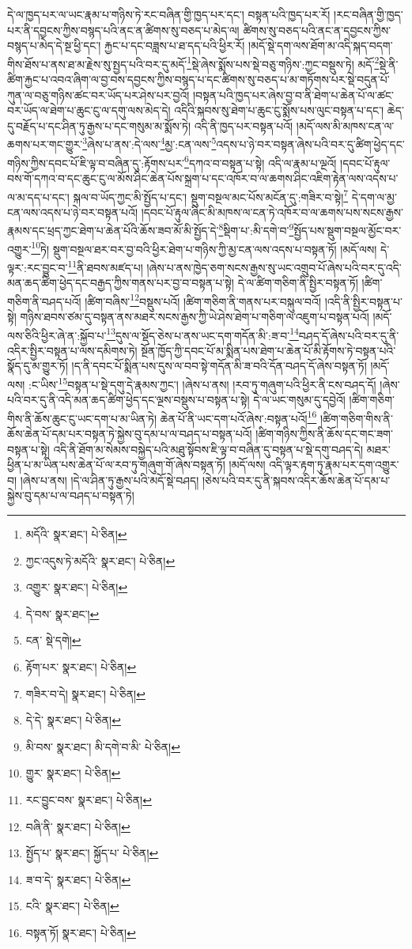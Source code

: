 དེ་ལ་ཁྱད་པར་ལ་ཡང་རྣམ་པ་གཉིས་ཏེ་རང་བཞིན་གྱི་ཁྱད་པར་དང་། བསྟན་པའི་ཁྱད་པར་རོ། །རང་བཞིན་གྱི་ཁྱད་པར་ནི་དབྱངས་ཀྱིས་བསྙད་པའི་ནང་ན་ཚིགས་སུ་བཅད་པ་མེད་ལ། ཚིགས་སུ་བཅད་པའི་ནང་ན་དབྱངས་ཀྱིས་བསྙད་པ་མེད་དེ་སྔ་ཕྱི་དང་། རྐྱང་པ་དང་བཟླས་པ་ཐ་དད་པའི་ཕྱིར་རོ། །མདོ་སྡེ་དག་ལས་ཐོག་མ་འདི་སྐད་བདག་གིས་ཐོས་པ་ནས་ཐ་མ་རྗེས་སུ་སྤྱད་པའི་བར་དུ་མདོ་\footnote{མདོའི་  སྣར་ཐང་།  པེ་ཅིན། }སྡེ་ཞེས་སྨོས་པས་སྡེ་བཅུ་གཉིས་:ཀྱང་བསྡུས་ཏེ། མདོ་\footnote{ཀྱང་འདུས་ཏེ་མདོའི་  སྣར་ཐང་།  པེ་ཅིན། }སྡེ་ནི་ཚིག་རྐྱང་པ་འབའ་ཞིག་ལ་བྱ་བས་དབྱངས་ཀྱིས་བསྙད་པ་དང་ཚིགས་སུ་བཅད་པ་མ་གཏོགས་པར་སྡེ་བདུན་པོ་ཀུན་ལ་བཅུ་གཉིས་ཚང་བར་ཡོད་པར་ཤེས་པར་བྱའོ། །བསྟན་པའི་ཁྱད་པར་ཞེས་བྱ་བ་ནི་ཐེག་པ་ཆེན་པོ་ལ་ཚང་བར་ཡོད་ལ་ཐེག་པ་ཆུང་ངུ་ལ་དགུ་ལས་མེད་དེ། འདིའི་སྐབས་སུ་ཐེག་པ་ཆུང་ངུ་སྨོས་པས་ལུང་བསྟན་པ་དང་། ཆེད་དུ་བརྗོད་པ་དང་ཤིན་ཏུ་རྒྱས་པ་དང་གསུམ་མ་སྨོས་ཏེ། འདི་ནི་ཁྱད་པར་བསྟན་པའོ། །མདོ་ལས་མི་མཁས་ངན་ལ་ཆགས་པར་གང་གྱུར་\footnote{འགྱུར་  སྣར་ཐང་།  པེ་ཅིན། }ཞེས་པ་ནས་:དེ་ལས་\footnote{དེ་བས་  སྣར་ཐང་། }མྱ་:ངན་ལས་\footnote{ངན་  སྡེ་དགེ། }འདས་པ་ཉེ་བར་བསྟན་ཞེས་པའི་བར་དུ་ཚིག་ཕྱེད་དང་གཉིས་ཀྱིས་དབང་པོ་ཇི་ལྟ་བ་བཞིན་དུ་:རྟོགས་པར་\footnote{རྟོག་པར་  སྣར་ཐང་།  པེ་ཅིན། }དཀའ་བ་བསྟན་པ་སྟེ། འདི་ལ་རྣམ་པ་ལྔའོ། །དབང་པོ་རྟུལ་བས་གོ་དཀའ་བ་དང་ཆུང་ངུ་ལ་མོས་ཤིང་ཆེན་པོས་སྐྲག་པ་དང་འཁོར་བ་ལ་ཆགས་ཤིང་འཇིག་རྟེན་ལས་འདས་པ་ལ་མ་དད་པ་དང་། སྐལ་བ་ཡོད་ཀྱང་མི་སྤྱོད་པ་དང་། སྡུག་བསྔལ་མང་པོས་མངོན་དུ་:གཟིར་བ་སྟེ།\footnote{གཟིར་བ་དེ།  སྣར་ཐང་།  པེ་ཅིན། } དེ་དག་ལ་མྱ་ངན་ལས་འདས་པ་ཉེ་བར་བསྟན་པའོ། །དབང་པོ་རྟུལ་ཞིང་མི་མཁས་ལ་ངན་ཏེ་འཁོར་བ་ལ་ཆགས་པས་སངས་རྒྱས་རྣམས་དང་ཕྲད་ཀྱང་ཐེག་པ་ཆེན་པོའི་ཆོས་ཟབ་མོ་མི་སྤྱོད་དེ་\footnote{དེ་དེ་  སྣར་ཐང་།  པེ་ཅིན། }སྡིག་པ་:མི་དགེ་བ་\footnote{མི་བས་  སྣར་ཐང་། མི་དགེ་བ་མི་  པེ་ཅིན། }སྤྱོད་པས་སྡུག་བསྔལ་མྱོང་བར་འགྱུར་\footnote{གྱུར་  སྣར་ཐང་།  པེ་ཅིན། }ཏེ། སྡུག་བསྔལ་ཐར་བར་བྱ་བའི་ཕྱིར་ཐེག་པ་གཉིས་ཀྱི་མྱ་ངན་ལས་འདས་པ་བསྟན་ཏོ། །མདོ་ལས། དེ་ལྟར་:རང་བྱུང་བ་\footnote{རང་བྱུང་བས་  སྣར་ཐང་།  པེ་ཅིན། }ནི་ཐབས་མཛད་པ། །ཞེས་པ་ནས་ཁྱེད་ཅག་སངས་རྒྱས་སུ་ཡང་འགྲུབ་པོ་ཞེས་པའི་བར་དུ་འདི་མན་ཆད་ཚིག་ཕྱེད་དང་བརྒྱད་ཀྱིས་གནས་པར་བྱ་བ་བསྟན་པ་སྟེ། དེ་ལ་ཚིག་གཅིག་ནི་སྤྱིར་བསྟན་ཏོ། །ཚིག་གཅིག་ནི་བཤད་པའོ། །ཚིག་བཞིས་\footnote{བཞི་ནི་  སྣར་ཐང་།  པེ་ཅིན། }བསྡུས་པའོ། །ཚིག་གཅིག་ནི་གནས་པར་བསྐུལ་བའོ། །འདི་ནི་སྤྱིར་བསྟན་པ་སྟེ། གཉིས་ཐབས་ཙམ་དུ་བསྟན་ནས་མཐར་སངས་རྒྱས་ཀྱི་ཡེ་ཤེས་ཐེག་པ་གཅིག་ལ་འཇུག་པ་བསྟན་པའོ། །མདོ་ལས་ཅིའི་ཕྱིར་ཞེ་ན་:སྐྱོབ་པ་\footnote{སྤྱོད་པ་  སྣར་ཐང་། སྐྱོད་པ་  པེ་ཅིན། }དུས་ལ་སྡོད་ཅེས་པ་ནས་ཡང་དག་གདོན་མི་:ཟ་བ་\footnote{ཟ་བ་དེ་  སྣར་ཐང་།  པེ་ཅིན། }བཤད་དོ་ཞེས་པའི་བར་དུ་ནི་འདིར་སྤྱིར་བསྟན་པ་ལས་དམིགས་ཏེ། སྔོན་ཁྱོད་ཀྱི་དབང་པོ་མ་སྨིན་པས་ཐེག་པ་ཆེན་པོ་མི་རྟོགས་ཏེ་བསྟན་པའི་སྣོད་དུ་མ་གྱུར་ཏོ། །ད་ནི་དབང་པོ་སྨིན་པས་དུས་ལ་བབ་སྟེ་གདོན་མི་ཟ་བའི་དོན་བཤད་དོ་ཞེས་བསྟན་ཏོ། །མདོ་ལས། :ང་ཡིས་\footnote{ངའི་  སྣར་ཐང་།  པེ་ཅིན། }བསྟན་པ་སྡེ་དགུ་དེ་རྣམས་ཀྱང་། །ཞེས་པ་ནས། །རབ་ཏུ་གཞུག་པའི་ཕྱིར་ནི་ངས་བཤད་དོ། །ཞེས་པའི་བར་དུ་ནི་འདི་མན་ཆད་ཚིག་ཕྱེད་དང་ལྔས་བསྡུས་པ་བསྟན་པ་སྟེ། དེ་ལ་ཡང་གསུམ་དུ་དབྱེའོ། །ཚིག་གཅིག་གིས་ནི་ཆོས་ཆུང་ངུ་ཡང་དག་པ་མ་ཡིན་ཏེ། ཆེན་པོ་ནི་ཡང་དག་པའོ་ཞེས་:བསྟན་པའོ།\footnote{བསྟན་ཏོ།  སྣར་ཐང་།  པེ་ཅིན། } །ཚིག་གཅིག་གིས་ནི་ཆོས་ཆེན་པོ་དམ་པར་བསྟན་ཏེ་སྐྱེས་བུ་དམ་པ་ལ་བཤད་པ་བསྟན་པའོ། །ཚིག་གཉིས་ཀྱིས་ནི་ཆོས་དང་གང་ཟག་བསྟན་པ་སྟེ། འདི་ནི་ཐོག་མ་སེམས་བསྐྱེད་པའི་མཐུ་སྟོབས་ཇི་ལྟ་བ་བཞིན་དུ་བསྟན་པ་སྡེ་དགུ་བཤད་དེ། མཐར་ཕྱིན་པ་མ་ཡིན་པས་ཆེན་པོ་ལ་རབ་ཏུ་གཞུག་གོ་ཞེས་བསྟན་ཏོ། །མདོ་ལས། འདི་ལྟར་རྟག་ཏུ་རྣམ་པར་དག་འགྱུར་བ། །ཞེས་པ་ནས། །དེ་ལ་ཤིན་ཏུ་རྒྱས་པའི་མདོ་སྡེ་བཤད། །ཅེས་པའི་བར་དུ་ནི་སྐབས་འདིར་ཆོས་ཆེན་པོ་དམ་པ་སྐྱེས་བུ་དམ་པ་ལ་བཤད་པ་བསྟན་ཏེ། 